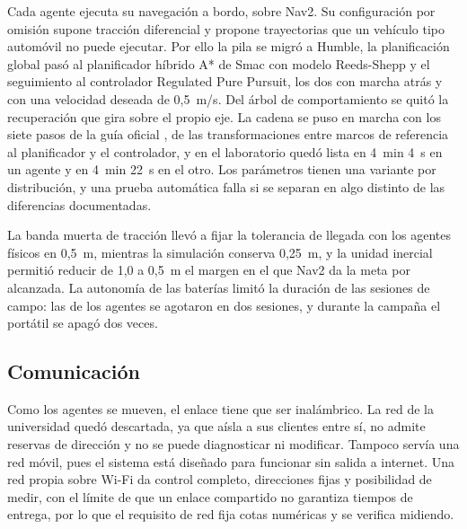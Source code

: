 Cada agente ejecuta su navegación a bordo, sobre Nav2. Su configuración por omisión supone tracción diferencial y propone trayectorias que un vehículo tipo automóvil no puede ejecutar. Por ello la pila se migró a Humble, la planificación global pasó al planificador híbrido A* de Smac con modelo Reeds-Shepp y el seguimiento al controlador Regulated Pure Pursuit, los dos con marcha atrás y con una velocidad deseada de 0,5~m/s. Del árbol de comportamiento se quitó la recuperación que gira sobre el propio eje. La cadena se puso en marcha con los siete pasos de la guía oficial \autocite{nav2setup}, de las transformaciones entre marcos de referencia al planificador y el controlador, y en el laboratorio quedó lista en 4~min 4~s en un agente y en 4~min 22~s en el otro. Los parámetros tienen una variante por distribución, y una prueba automática falla si se separan en algo distinto de las diferencias documentadas.

La banda muerta de tracción llevó a fijar la tolerancia de llegada con los agentes físicos en 0,5~m, mientras la simulación conserva 0,25~m, y la unidad inercial permitió reducir de 1,0 a 0,5~m el margen en el que Nav2 da la meta por alcanzada. La autonomía de las baterías limitó la duración de las sesiones de campo: las de los agentes se agotaron en dos sesiones, y durante la campaña el portátil se apagó dos veces.

\subsection{Comunicación}
\label{sec:dos-vehiculos}
\label{sec:red}

Como los agentes se mueven, el enlace tiene que ser inalámbrico. La red de la universidad quedó descartada, ya que aísla a sus clientes entre sí, no admite reservas de dirección y no se puede diagnosticar ni modificar. Tampoco servía una red móvil, pues el sistema está diseñado para funcionar sin salida a internet. Una red propia sobre Wi-Fi da control completo, direcciones fijas y posibilidad de medir, con el límite de que un enlace compartido no garantiza tiempos de entrega, por lo que el requisito de red fija cotas numéricas y se verifica midiendo.

